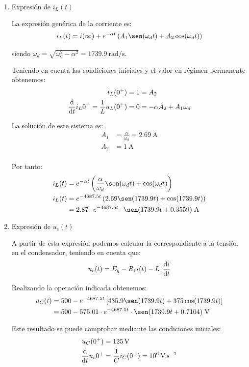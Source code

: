\begin{enumerate}
    
\item Expresión de $i_L(t)$

  La expresión genérica de la corriente es:
  \[
    i_L(t) = i(\infty) + e^{-\alpha t} \left(A_1 \sen(\omega_d t) + A_2 \cos(\omega_d t)\right)
  \]

  siendo $\omega_d = \sqrt{\omega_o^2 - \alpha^2} = \SI{1739.9}{\radian\per\second}$.

  \vspace{3mm}
  Teniendo en cuenta las condiciones iniciales y el valor en régimen permanente obtenemos:
  \begin{align*}
    i_L(0^+) = 1 &= A_2\\
    \diff*{i_L}{t}{0^+} = \frac{1}{L}u_L(0^+) = 0 &= -\alpha A_2 + A_1 \omega_d
  \end{align*}

  La solución de este sistema es:
  \begin{align*}
    A_1 &= \frac{\alpha}{\omega_d} = \qty{2.69}\ampere\\
    A_2 &= \qty{1}{\ampere}\\
  \end{align*}
  
  Por tanto:
  \begin{align*}
        i_L(t) &= e^{-\alpha t} \left(\frac{\alpha}{\omega_d} \sen(\omega_d t) + \cos(\omega_d t)\right)\\
    i_L(t) &= e^{-4687.5 t} \left(2.69 \sen(1739.9t) + \cos(1739.9 t)\right)\\
               &= 2.87 \cdot e^{-4687.5 t} \cdot \sen(1739.9t + 0.3559) \;\si{\ampere}
  \end{align*}

\vspace{2mm}

\item Expresión de $u_c(t)$

  A partir de esta expresión podemos calcular la correspondiente a la tensión en el condensador, teniendo en cuenta que:
  \[
    u_c(t) = E_g - R_1 i(t) - L_1 \diff{i}{t} 
  \]
  
  Realizando la operación indicada obtenemos:
  \begin{align*}
    u_C(t) &= 500 - e^{-4687.5 t} \left[435.9 \sen(1739.9t) + 375 \cos(1739.9 t)\right]\\
           &= 500 - 575.01 \cdot e^{-4687.5 t} \cdot  \sen(1739.9t + 0.7104)\;\si{\volt}
  \end{align*}

  Este resultado se puede comprobar mediante las condiciones iniciales:
    \begin{align*}
    u_C(0^+) &= \qty{125}{\volt}\\
    \diff*{u_c}{t}{0^+} &= \frac{1}{C}i_C(0^+) = 10^6\,\si{\volt\per\second}\\
  \end{align*}

\end{enumerate}




